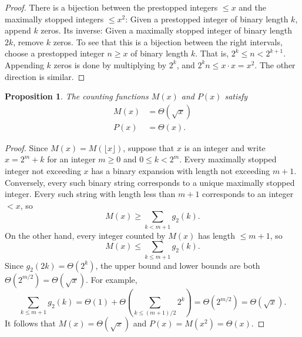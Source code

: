\documentclass[12pt]{amsart}
\newtheorem{proposition}{Proposition}
\theoremstyle{definition}
\begin{document}
\begin{proof}
    There is a bijection between the prestopped integers $\leq x$ and the
    maximally stopped integers $\leq x^2$: Given a prestopped integer of binary
    length $k$, append $k$ zeros. Its inverse: Given a maximally stopped
    integer of binary length $2k$, remove $k$ zeros. To see that this is a
    bijection between the right intervals, choose a prestopped integer $n \geq
    x$ of binary length $k$. That is, $2^k \leq n < 2^{k + 1}$. Appending $k$
    zeros is done by multiplying by $2^k$, and $2^k n \leq x \cdot x = x^2$.
    The other direction is similar.
\end{proof}

\begin{proposition}
    The counting functions $M(x)$ and $P(x)$ satisfy
    \begin{align*}
        M(x) &= \Theta(\sqrt{x}) \\
        P(x) &= \Theta(x).
    \end{align*}
\end{proposition}

\begin{proof}
    Since $M(x) = M(\lfloor x \rfloor)$, suppose that $x$ is an integer and
    write $x = 2^m + k$ for an integer $m \geq 0$ and $0 \leq k < 2^m$. Every
    maximally stopped integer not exceeding $x$ has a binary expansion with
    length not exceeding $m + 1$. Conversely, every such binary string
    corresponds to a unique maximally stopped integer. Every such string with
    length less than $m + 1$ corresponds to an integer $< x$, so
    \begin{equation*}
        M(x) \geq \sum_{k < m + 1} g_2(k).
    \end{equation*}
    On the other hand, every integer counted by $M(x)$ has length $\leq m + 1$,
    so
    \begin{equation*}
        M(x) \leq \sum_{k \leq m + 1} g_2(k).
    \end{equation*}
    Since $g_2(2k) = \Theta(2^k)$, the upper bound and lower bounds are both
    $\Theta(2^{m / 2}) = \Theta(\sqrt{x})$. For example,
    \begin{equation*}
        \sum_{k \leq m + 1} g_2(k) = \Theta(1) + \Theta(\sum_{k \leq (m + 1) / 2} 2^k) = \Theta(2^{m / 2}) = \Theta(\sqrt{x}).
    \end{equation*}
    It follows that $M(x) = \Theta(\sqrt{x})$ and $P(x) = M(x^2) = \Theta(x)$.
\end{proof}
\end{document}
